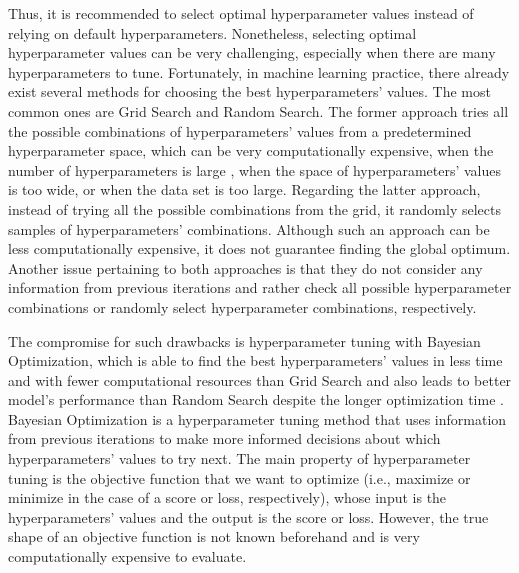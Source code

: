 Thus, it is recommended to select optimal hyperparameter values instead of relying on default hyperparameters.
Nonetheless, selecting optimal hyperparameter values can be very challenging, especially when there are many hyperparameters to tune.
Fortunately, in machine learning practice, there already exist several methods for choosing the best hyperparameters' values. The most common ones are Grid Search and Random Search.
The former approach tries all the possible combinations of hyperparameters' values from a predetermined hyperparameter space, which can be very computationally expensive, when the number of hyperparameters is large \citep{marinov2019hyperparameter}, when the space of hyperparameters' values is too wide, or when the data set is too large.
Regarding the latter approach, instead of trying all the possible combinations from the grid, it randomly selects samples of hyperparameters' combinations. Although such an approach can be less computationally expensive, it does not guarantee finding the global optimum.
Another issue pertaining to both approaches is that they do not consider any information from previous iterations and rather check all possible hyperparameter combinations or randomly select hyperparameter combinations, respectively.

The compromise for such drawbacks is hyperparameter tuning with Bayesian Optimization, which is able to find the best hyperparameters' values in less time and with fewer computational resources than Grid Search and also leads to better model's performance than Random Search despite the longer optimization time \citep{drahokoupil2022application}.
Bayesian Optimization is a hyperparameter tuning method that uses information from previous iterations to make more informed decisions about which hyperparameters' values to try next.
The main property of hyperparameter tuning is the objective function that we want to optimize (i.e., maximize or minimize in the case of a score or loss, respectively), whose input is the hyperparameters' values and the output is the score or loss. However, the true shape of an objective function is not known beforehand and is very computationally expensive to evaluate.



